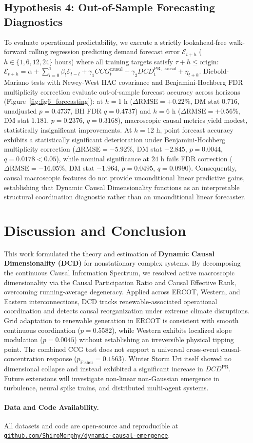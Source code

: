 \documentclass[10pt,twocolumn,journal]{article}
\begin{document}
\subsection{Hypothesis 4: Out-of-Sample Forecasting Diagnostics}
To evaluate operational predictability, we execute a strictly lookahead-free walk-forward rolling regression predicting demand forecast error $\mathcal{E}_{t+h}$ ($h \in \{1, 6, 12, 24\}$ hours) where all training targets satisfy $\tau + h \le \text{origin}$: $\mathcal{E}_{t+h} = \alpha + \sum_{l=0}^1 \beta_l \mathcal{E}_{t-l} + \gamma_1 CCG_t^{\text{causal}} + \gamma_2 DCD_t^{\text{PR, causal}} + \eta_{t+h}$. Diebold-Mariano tests with Newey-West HAC covariance and Benjamini-Hochberg FDR multiplicity correction evaluate out-of-sample forecast accuracy across horizons (Figure~\ref{fig:fig6_forecasting}): at $h=1$ h ($\Delta\text{RMSE} = +0.22\%$, DM stat $0.716$, unadjusted $p = 0.4737$, BH FDR $q = 0.4737$) and $h=6$ h ($\Delta\text{RMSE} = +0.56\%$, DM stat $1.181$, $p = 0.2376$, $q = 0.3168$), macroscopic causal metrics yield modest, statistically insignificant improvements. At $h=12$ h, point forecast accuracy exhibits a statistically significant deterioration under Benjamini-Hochberg multiplicity correction ($\Delta\text{RMSE} = -5.92\%$, DM stat $-2.845$, $p = 0.0044$, $q = 0.0178 < 0.05$), while nominal significance at $24$ h fails FDR correction ($\Delta\text{RMSE} = -16.05\%$, DM stat $-1.964$, $p = 0.0495$, $q = 0.0990$). Consequently, causal macroscopic features do not provide unconditional linear predictive gains, establishing that Dynamic Causal Dimensionality functions as an interpretable structural coordination diagnostic rather than an unconditional linear forecaster.

\section{Discussion and Conclusion}
This work formulated the theory and estimation of \textbf{Dynamic Causal Dimensionality (DCD)} for nonstationary complex systems. By decomposing the continuous Causal Information Spectrum, we resolved active macroscopic dimensionality via the Causal Participation Ratio and Causal Effective Rank, overcoming running-average degeneracy. Applied across ERCOT, Western, and Eastern interconnections, DCD tracks renewable-associated operational coordination and detects causal reorganization under extreme climate disruptions. Grid adaptation to renewable generation in ERCOT is consistent with smooth continuous coordination ($p=0.5582$), while Western exhibits localized slope modulation ($p=0.0045$) without establishing an irreversible physical tipping point. The combined CCG test does not support a universal cross-event causal-concentration response ($p_{\text{Fisher}} = 0.1563$). Winter Storm Uri itself showed no dimensional collapse and instead exhibited a significant increase in $DCD^{\text{PR}}$. Future extensions will investigate non-linear non-Gaussian emergence in turbulence, neural spike trains, and distributed multi-agent systems.

\paragraph{Data and Code Availability.}
All datasets and code are open-source and reproducible at \href{https://github.com/ShiroMorphy/dynamic-causal-emergence}{\nolinkurl{github.com/ShiroMorphy/dynamic-causal-emergence}}.



\end{document}
